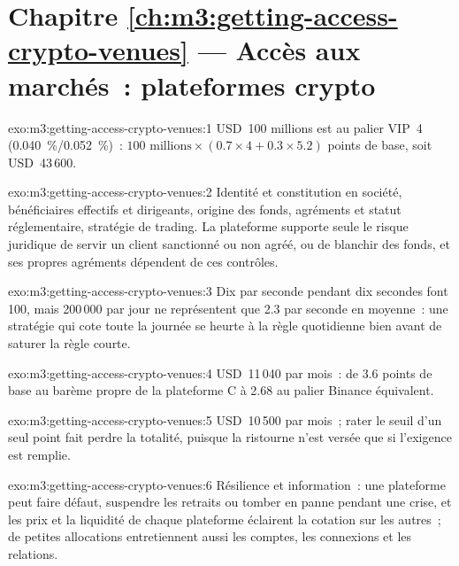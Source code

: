 \section*{Chapitre \ref{ch:m3:getting-access-crypto-venues} --- Accès aux marchés~: plateformes crypto}

\begin{solution}{exo:m3:getting-access-crypto-venues:1}
USD~100 millions est au palier VIP~4 (0.040~\%/0.052~\%)~: $100\text{ millions} \times (0.7 \times 4 + 0.3 \times 5.2)$ points de base, soit USD~43\,600.
\end{solution}

\begin{solution}{exo:m3:getting-access-crypto-venues:2}
Identité et constitution en société, bénéficiaires effectifs et dirigeants, origine des fonds, agréments et statut réglementaire, stratégie de trading. La
plateforme supporte seule le risque juridique de servir un client sanctionné ou non agréé, ou de blanchir des fonds, et ses propres agréments dépendent de ces contrôles.
\end{solution}

\begin{solution}{exo:m3:getting-access-crypto-venues:3}
Dix par seconde pendant dix secondes font 100, mais 200\,000 par jour ne représentent que 2.3 par seconde en moyenne~: une stratégie qui cote
toute la journée se heurte à la règle quotidienne bien avant de saturer la règle courte.
\end{solution}

\begin{solution}{exo:m3:getting-access-crypto-venues:4}
USD~11\,040 par mois~: de 3.6 points de base au barème propre de la plateforme C à 2.68 au palier Binance équivalent.
\end{solution}

\begin{solution}{exo:m3:getting-access-crypto-venues:5}
USD~10\,500 par mois~; rater le seuil d'un seul point fait perdre la totalité, puisque la ristourne n'est versée que si l'exigence est remplie.
\end{solution}

\begin{solution}{exo:m3:getting-access-crypto-venues:6}
Résilience et information~: une plateforme peut faire défaut, suspendre les retraits ou tomber en panne pendant une crise, et les prix et la liquidité de chaque plateforme éclairent la cotation
sur les autres~; de petites allocations entretiennent aussi les comptes, les connexions et les relations.
\end{solution}

